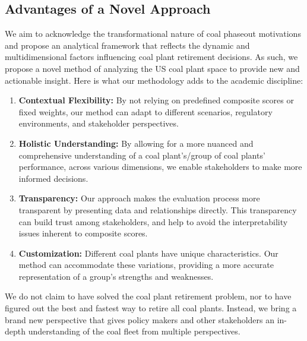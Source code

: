 \subsection{Advantages of a Novel Approach}
We aim to acknowledge the transformational nature of coal phaseout motivations and propose an analytical framework that reflects the 
dynamic and multidimensional factors influencing coal plant retirement decisions. As such, we propose a novel method of analyzing the 
US coal plant space to provide new and actionable insight. Here is what our methodology adds to the academic discipline:

\begin{enumerate}
    \item \textbf{Contextual Flexibility:} By not relying on predefined composite scores or fixed weights, our method can adapt to different scenarios, regulatory environments, and stakeholder perspectives.
    \item \textbf{Holistic Understanding:} By allowing for a more nuanced and comprehensive understanding of a coal plant's/group of coal plants' performance, across various dimensions, we enable stakeholders to make more informed decisions.
    \item \textbf{Transparency:} Our approach makes the evaluation process more transparent by presenting data and relationships directly. This transparency can build trust among stakeholders, and help to avoid the interpretability issues inherent to composite scores.
    \item \textbf{Customization:} Different coal plants have unique characteristics. Our method can accommodate these variations, providing a more accurate representation of a group's strengths and weaknesses.
\end{enumerate}

We do not claim to have solved the coal plant retirement problem, nor to have figured out the best and fastest way to retire all coal plants. 
Instead, we bring a brand new perspective that gives policy makers and other stakeholders an in-depth understanding of the coal fleet from 
multiple perspectives.